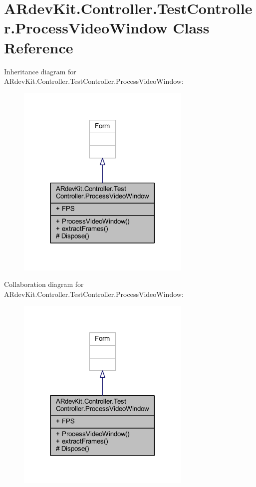 \hypertarget{class_a_rdev_kit_1_1_controller_1_1_test_controller_1_1_process_video_window}{\section{A\-Rdev\-Kit.\-Controller.\-Test\-Controller.\-Process\-Video\-Window Class Reference}
\label{class_a_rdev_kit_1_1_controller_1_1_test_controller_1_1_process_video_window}
}


Inheritance diagram for A\-Rdev\-Kit.\-Controller.\-Test\-Controller.\-Process\-Video\-Window\-:
\nopagebreak
\begin{figure}[H]
\begin{center}
\leavevmode
\includegraphics[width=236pt]{class_a_rdev_kit_1_1_controller_1_1_test_controller_1_1_process_video_window__inherit__graph}
\end{center}
\end{figure}


Collaboration diagram for A\-Rdev\-Kit.\-Controller.\-Test\-Controller.\-Process\-Video\-Window\-:
\nopagebreak
\begin{figure}[H]
\begin{center}
\leavevmode
\includegraphics[width=236pt]{class_a_rdev_kit_1_1_controller_1_1_test_controller_1_1_process_video_window__coll__graph}
\end{center}
\end{figure}
